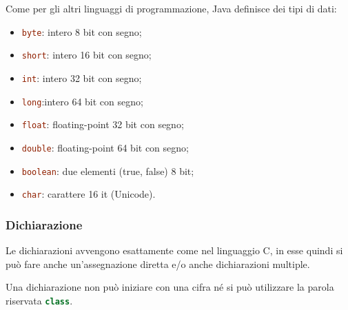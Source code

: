 \documentclass{subfiles}
\begin{document}
Come per gli altri linguaggi di programmazione, Java definisce dei tipi di dati:
\begin{itemize}
    \item \lstinline[language = Java]{byte}: intero 8 bit con segno;
    \item \lstinline[language = Java]{short}: intero 16 bit con segno;
    \item \lstinline[language = Java]{int}: intero 32 bit con segno;
    \item \lstinline[language = Java]{long}:intero 64 bit con segno;
    \item \lstinline[language = Java]{float}: floating-point 32 bit con segno;
    \item \lstinline[language = Java]{double}: floating-point 64 bit con segno;
    \item \lstinline[language = Java]{boolean}: due elementi (true, false) 8 bit;
    \item \lstinline[language = Java]{char}: carattere 16  it (Unicode).
\end{itemize}

\subsubsection{Dichiarazione}
Le dichiarazioni avvengono esattamente come nel linguaggio C, in esse quindi si può fare anche un'assegnazione diretta
e/o anche dichiarazioni multiple.

\begin{Note*}
    Una dichiarazione non può iniziare con una cifra né si può utilizzare la parola riservata \lstinline[language = java]{class}.
\end{Note*}
\end{document}
